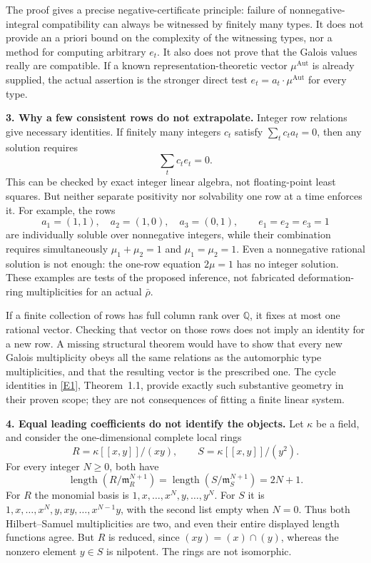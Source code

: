 \documentclass[11pt,a4paper]{article}
\newcommand{\Q}{\mathbb{Q}}
\newcommand{\eref}[2]{\hyperlink{extra:#1:#2}{[E#2]}}
\numberwithin{equation}{section}
\begin{document}
The proof gives a precise negative-certificate principle: failure of
nonnegative-integral compatibility can always be witnessed by finitely
many types. It does not provide an a priori bound on the complexity
of the witnessing types, nor a method for computing arbitrary $e_t$.
It also does not prove that the Galois values really are compatible.
If a known representation-theoretic vector $\mu^{\mathrm{Aut}}$ is
already supplied, the actual assertion is the stronger direct test
$e_t=a_t\cdot\mu^{\mathrm{Aut}}$ for every type.

\textbf{3. Why a few consistent rows do not extrapolate.}
Integer row relations give necessary identities. If finitely many
integers $c_t$ satisfy $\sum_t c_t a_t=0$, then any solution requires
\begin{equation}\label{30006981:rowrelation}
 \sum_t c_t e_t=0.
\end{equation}
This can be checked by exact integer linear algebra, not floating-point
least squares. But neither separate positivity nor solvability one row
at a time enforces it. For example, the rows
\[
 a_1=(1,1),\quad a_2=(1,0),\quad a_3=(0,1),
 \qquad e_1=e_2=e_3=1
\]
are individually soluble over nonnegative integers, while their
combination requires simultaneously $\mu_1+\mu_2=1$ and
$\mu_1=\mu_2=1$. Even a nonnegative rational solution is not enough:
the one-row equation $2\mu=1$ has no integer solution. These examples
are tests of the proposed inference, not fabricated deformation-ring
multiplicities for an actual $\bar\rho$.

If a finite collection of rows has full column rank over $\Q$, it fixes
at most one rational vector. Checking that vector on those rows does
not imply an identity for a new row. A missing structural theorem would
have to show that every new Galois multiplicity obeys all the same
relations as the automorphic type multiplicities, and that the resulting
vector is the prescribed one. The cycle identities in
\eref{30006981}{1}, Theorem~1.1, provide exactly such substantive geometry
in their proven scope; they are not consequences of fitting a finite
linear system.

\textbf{4. Equal leading coefficients do not identify the objects.}
Let $\kappa$ be a field, and consider the one-dimensional complete local
rings
\[
 R=\kappa[[x,y]]/(xy),\qquad S=\kappa[[x,y]]/(y^2).
\]
For every integer $N\ge0$, both have
\begin{equation}\label{30006981:length}
 \operatorname{length}(R/\mathfrak m_R^{N+1})
 =\operatorname{length}(S/\mathfrak m_S^{N+1})=2N+1.
\end{equation}
For $R$ the monomial basis is $1,x,\ldots,x^N,y,\ldots,y^N$.
For $S$ it is $1,x,\ldots,x^N,y,xy,\ldots,x^{N-1}y$, with the
second list empty when $N=0$. Thus both Hilbert--Samuel multiplicities
are two, and even their entire displayed length functions agree.
But $R$ is reduced, since $(xy)=(x)\cap(y)$, whereas the nonzero element
$y\in S$ is nilpotent. The rings are not isomorphic.
\end{document}
